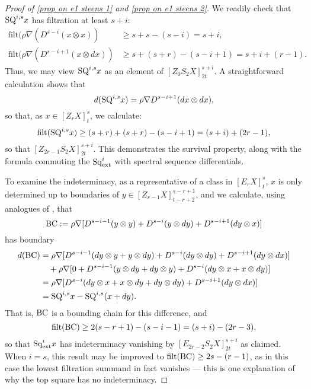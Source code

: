 \documentclass[11pt]{amsart} \renewcommand{\baselinestretch}{1.2}
\theoremstyle{plain}
\theoremstyle{definition}
\newcommand{\Nabla}{\nabla}
\newcommand{\Sq}{\mathrm{Sq}}
\newcommand{\Edownup}[5]{[E_{#1}^{#2}#3]^{#4}_{#5}}
\newcommand{\EZdownup}[5]{[Z^{#2}_{#1}#3]^{#4}_{#5}}
\newcommand{\filt}{\mathrm{filt}}
\begin{document}
\begin{second quadrant homotopy sseq operations}
\begin{proof}[Proof of \ref{prop on e1 steens 1} and \ref{prop on e1 steens 2}]
We readily check that $\textup{SQ}^{i,s}x$ has filtration at least $s+i$:
\begin{align*}
\filt(\rho\Nabla (D^{s-i}(x\otimes x))&\geq s+s-(s-i)=s+i,\\
\filt(\rho\Nabla (D^{s-i+1}(x\otimes dx))&\geq s+(s+r)-(s-i+1)=s+i+(r-1).
\end{align*}
Thus, we may view $\textup{SQ}^{i,s}x$ as an element of $\EZdownup{0}{}{S_2X}{s+i}{2t}$. 
A straightforward calculation shows that \[d(\textup{SQ}^{i,s}x)=\rho\Nabla D^{s-i+1}(dx\otimes dx),\] so that, as $x\in \EZdownup{r}{}{X}{s}{t}$, we calculate:
\[\filt(\textup{SQ}^{i,s}x)\geq (s+r)+(s+r)-(s-i+1)=(s+i)+(2r-1),\]
so that $\EZdownup{2r-1}{}{S_2X}{s+i}{2t}$. This demonstrates the survival property, along with the formula commuting the $\Sq^i_\textup{ext}$ with spectral sequence differentials.

To examine the indeterminacy, as a representative of a class in $\Edownup{r}{}{X}{s}{t}$,  $x$ is only determined up to boundaries of $y\in \EZdownup{r-1}{}{X}{s-r+1}{t-r+2}  $, and we calculate, using analogues of \cite[(1.111) and (1.112)]{MR2245560}, that
\[\textup{BC}:=\rho\Nabla [D^{s-i-1}(y\otimes y)+D^{s-i}(y\otimes dy)+D^{s-i+1}(dy\otimes x)]\]
has boundary
\begin{alignat*}{2}
d(\textup{BC})
&=
\rho\Nabla [D^{s-i-1}(dy\otimes y+y\otimes dy)+D^{s-i}(dy\otimes dy)+D^{s-i+1}(dy\otimes dx)]%
\\
&\ \ \ +
\rho\Nabla [0+D^{s-i-1}(y\otimes dy+dy\otimes y)+D^{s-i}(dy\otimes x+x\otimes dy)]%
\\
&=
\rho\Nabla [D^{s-i}(dy\otimes x+x\otimes dy+dy\otimes dy)
+D^{s-i+1}(dy\otimes dx)]\\
&=\textup{SQ}^{i,s}x-\textup{SQ}^{i,s}(x+dy).%
\end{alignat*} 
That is, $\textup{BC}$ is a bounding chain for this difference, and
\[\filt(\textup{BC})\geq 2(s-r+1)-(s-i-1)=(s+i)-(2r-3),\]
so that $\Sq^i_\textup{ext}x$ has indeterminacy vanishing by $\Edownup{2r-2}{}{S_2X}{s+i}{2t}$ as claimed. When $i=s$, this result may be improved to $\filt(\textup{BC})\geq 2s-(r-1)$,  as in this case the lowest filtration summand in fact vanishes --- this is one explanation of why the top square has no indeterminacy.


\end{proof}
\end{second quadrant homotopy sseq operations}
\end{document}
